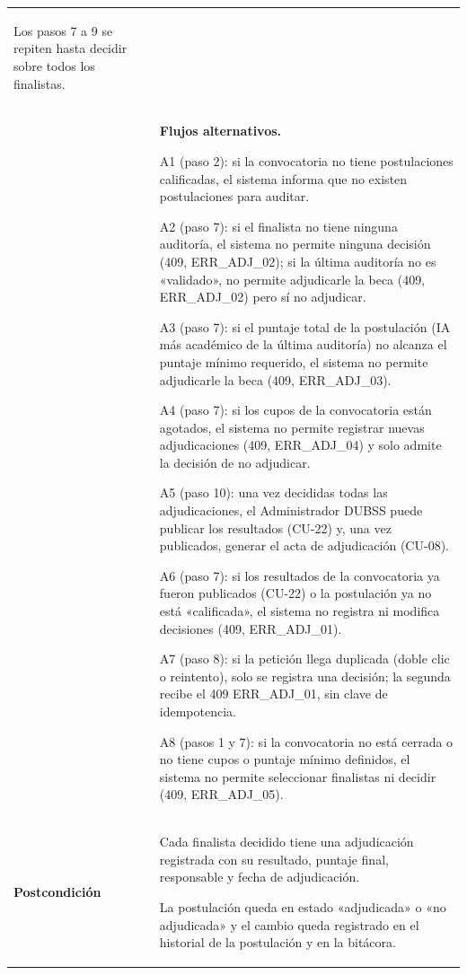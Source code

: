 \begin{longtable}{>{\raggedright\arraybackslash}p{2.9cm} >{\raggedright\arraybackslash}p{12.6cm}}
\begin{cupasos}
    \item Los pasos 7 a 9 se repiten hasta decidir sobre todos los finalistas.
\end{cupasos} \\
 & \textbf{Flujos alternativos.}
\begin{cuvin}
    \item A1 (paso 2): si la convocatoria no tiene postulaciones calificadas, el sistema informa que no existen postulaciones para auditar.
    \item A2 (paso 7): si el finalista no tiene ninguna auditoría, el sistema no permite ninguna decisión (409, ERR\_ADJ\_02); si la última auditoría no es «validado», no permite adjudicarle la beca (409, ERR\_ADJ\_02) pero sí no adjudicar.
    \item A3 (paso 7): si el puntaje total de la postulación (IA más académico de la última auditoría) no alcanza el puntaje mínimo requerido, el sistema no permite adjudicarle la beca (409, ERR\_ADJ\_03).
    \item A4 (paso 7): si los cupos de la convocatoria están agotados, el sistema no permite registrar nuevas adjudicaciones (409, ERR\_ADJ\_04) y solo admite la decisión de no adjudicar.
    \item A5 (paso 10): una vez decididas todas las adjudicaciones, el Administrador DUBSS puede publicar los resultados (CU-22) y, una vez publicados, generar el acta de adjudicación (CU-08).
    \item A6 (paso 7): si los resultados de la convocatoria ya fueron publicados (CU-22) o la postulación ya no está «calificada», el sistema no registra ni modifica decisiones (409, ERR\_ADJ\_01).
    \item A7 (paso 8): si la petición llega duplicada (doble clic o reintento), solo se registra una decisión; la segunda recibe el 409 ERR\_ADJ\_01, sin clave de idempotencia.
    \item A8 (pasos 1 y 7): si la convocatoria no está cerrada o no tiene cupos o puntaje mínimo definidos, el sistema no permite seleccionar finalistas ni decidir (409, ERR\_ADJ\_05).
\end{cuvin} \\
\midrule
\textbf{Postcondición} & \vspace{-\baselineskip}\begin{cuvin}
    \item Cada finalista decidido tiene una adjudicación registrada con su resultado, puntaje final, responsable y fecha de adjudicación.
    \item La postulación queda en estado «adjudicada» o «no adjudicada» y el cambio queda registrado en el historial de la postulación y en la bitácora.

\end{cuvin}
\end{longtable}
